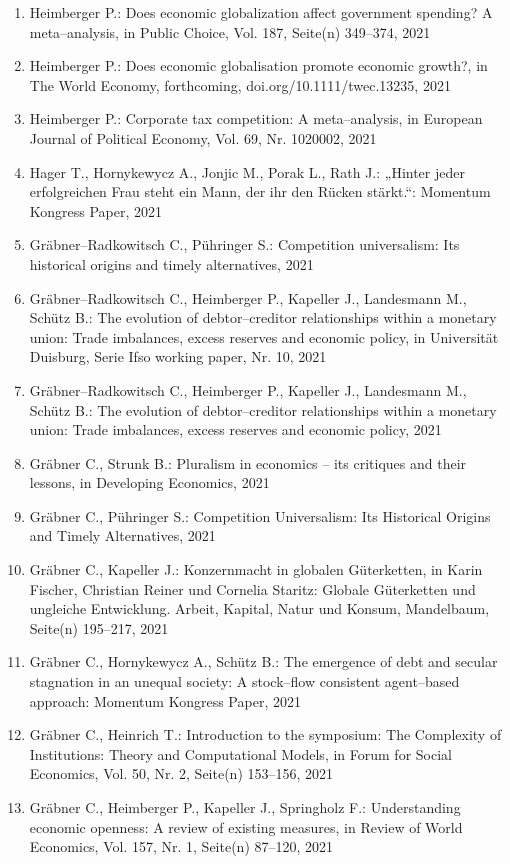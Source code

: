 \begin{enumerate}
	 \item Heimberger P.: Does economic globalization affect government spending? A meta--analysis, in Public Choice, Vol. 187, Seite(n) 349--374, 2021
	 \item Heimberger P.: Does economic globalisation promote economic growth?, in The World Economy, forthcoming, doi.org/10.1111/twec.13235, 2021
	 \item Heimberger P.: Corporate tax competition: A meta--analysis, in European Journal of Political Economy, Vol. 69, Nr. 1020002, 2021
	 \item Hager T., Hornykewycz A., Jonjic M., Porak L., Rath J.: „Hinter jeder erfolgreichen Frau steht ein Mann, der ihr den Rücken stärkt.“: Momentum Kongress Paper, 2021
	 \item Gräbner--Radkowitsch C., Pühringer S.: Competition universalism: Its historical origins and timely alternatives, 2021
	 \item Gräbner--Radkowitsch C., Heimberger P., Kapeller J., Landesmann M., Schütz B.: The evolution of debtor--creditor relationships within a monetary union: Trade imbalances, excess reserves and economic policy, in Universität Duisburg, Serie Ifso working paper, Nr. 10, 2021
	 \item Gräbner--Radkowitsch C., Heimberger P., Kapeller J., Landesmann M., Schütz B.: The evolution of debtor--creditor relationships within a monetary union: Trade imbalances, excess reserves and economic policy, 2021
	 \item Gräbner C., Strunk B.: Pluralism in economics – its critiques and their lessons, in Developing Economics, 2021
	 \item Gräbner C., Pühringer S.: Competition Universalism: Its Historical Origins and Timely Alternatives, 2021
	 \item Gräbner C., Kapeller J.: Konzernmacht in globalen Güterketten, in Karin Fischer, Christian Reiner und Cornelia Staritz: Globale Güterketten und ungleiche Entwicklung. Arbeit, Kapital, Natur und Konsum, Mandelbaum, Seite(n) 195--217, 2021
	 \item Gräbner C., Hornykewycz A., Schütz B.: The emergence of debt and secular stagnation in an unequal society: A stock--flow consistent agent--based approach: Momentum Kongress Paper, 2021
	 \item Gräbner C., Heinrich T.: Introduction to the symposium: The Complexity of Institutions: Theory and Computational Models, in Forum for Social Economics, Vol. 50, Nr. 2, Seite(n) 153--156, 2021
	 \item Gräbner C., Heimberger P., Kapeller J., Springholz F.: Understanding economic openness: A review of existing measures, in Review of World Economics, Vol. 157, Nr. 1, Seite(n) 87--120, 2021

\end{enumerate}
